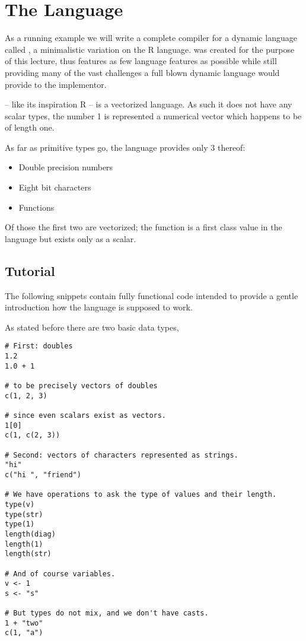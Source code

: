 \chapter{The \rift Language}

As a running example we will write a complete compiler for a dynamic language called \rift, a minimalistic variation on the R language. \Rift was created for the purpose of this lecture, thus features as few language features as possible while still providing many of the vast challenges a full blown dynamic language would provide to the implementor.

\Rift -- like its inspiration R -- is a vectorized language. As such it does not have any scalar types, \ie the number 1 is represented a numerical vector which happens to be of length one.

As far as primitive types go, the language provides only 3 thereof:
\begin{itemize}
\item Double precision numbers
\item Eight bit characters
\item Functions
\end{itemize}
Of those the first two are vectorized; the function is a first class value in the language but exists only as a scalar.

\section{Tutorial}

The following snippets contain fully functional \rift code intended to provide a gentle introduction how the language is supposed to work.

As stated before there are two basic data types,

\begin{lstlisting}[language=rift]
# First: doubles
1.2
1.0 + 1

# to be precisely vectors of doubles
c(1, 2, 3)

# since even scalars exist as vectors.
1[0]
c(1, c(2, 3))

# Second: vectors of characters represented as strings.
"hi"
c("hi ", "friend")

# We have operations to ask the type of values and their length.
type(v)
type(str)
type(1)
length(diag)
length(1)
length(str)

# And of course variables.
v <- 1
s <- "s"

# But types do not mix, and we don't have casts.
1 + "two"
c(1, "a")
\end{lstlisting}

